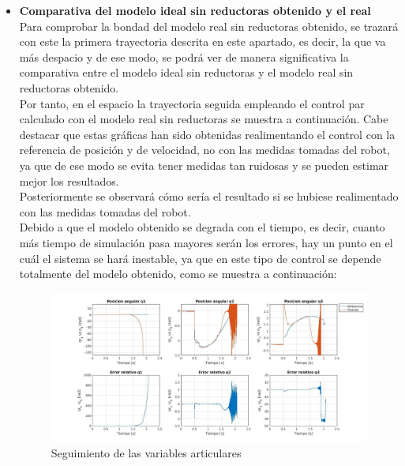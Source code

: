 \begin{itemize}
	\newpage
	\item \textbf{Comparativa del modelo ideal sin reductoras obtenido y el real} \\

	Para comprobar la bondad del modelo real sin reductoras obtenido, se trazará con este la primera trayectoria descrita en este apartado, es decir, la que va más despacio y de ese modo, se podrá ver de manera significativa la comparativa entre el modelo ideal sin reductoras y el modelo real sin reductoras obtenido. \\

	Por tanto, en el espacio la trayectoria seguida empleando el control par calculado con el modelo real sin reductoras se muestra a continuación. Cabe destacar que estas gráficas han sido obtenidas realimentando el control con la referencia de posición y de velocidad, no con las medidas tomadas del robot, ya que de ese modo se evita tener medidas tan ruidosas y se pueden estimar mejor los resultados.\\

	Posteriormente se observará cómo sería el resultado si se hubiese realimentado con las medidas tomadas del robot.\\



	Debido a que el modelo obtenido se degrada con el tiempo, es decir, cuanto más tiempo de simulación pasa mayores serán los errores, hay un punto en el cuál el sistema se hará inestable, ya que en este tipo de control se depende totalmente del modelo obtenido, como se muestra a continuación:



	\begin{figure}[h!]

		\centering

		\includegraphics[width=.8\textwidth]{exp4_posPDrealSR}

		\caption{Seguimiento de las variables articulares}

	\end{figure}



\end{itemize}
